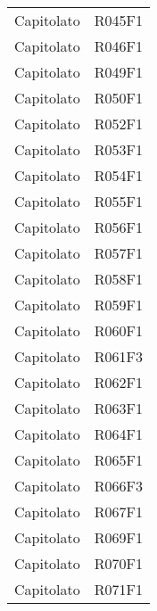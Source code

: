 \documentclass[../analisi-dei-requisiti.tex]{subfiles}
\begin{document}
\begin{center}
\begin{longtable}[H]{ p{3cm} | p{4cm} }
  Capitolato                    & R045F1                               \\
  Capitolato                    & R046F1                               \\
  Capitolato                    & R049F1                               \\
  Capitolato                    & R050F1                               \\
  Capitolato                    & R052F1                               \\
  Capitolato                    & R053F1                               \\
  Capitolato                    & R054F1                               \\
  Capitolato                    & R055F1                               \\
  Capitolato                    & R056F1                               \\
  Capitolato                    & R057F1                               \\
  Capitolato                    & R058F1                               \\
  Capitolato                    & R059F1                               \\
  Capitolato                    & R060F1                               \\
  Capitolato                    & R061F3                               \\
  Capitolato                    & R062F1                               \\
  Capitolato                    & R063F1                               \\
  Capitolato                    & R064F1                               \\
  Capitolato                    & R065F1                               \\
  Capitolato                    & R066F3                               \\
  Capitolato                    & R067F1                               \\
  Capitolato                    & R069F1                               \\
  Capitolato                    & R070F1                               \\
  Capitolato                    & R071F1                               \\

\end{longtable}
\end{center}
\end{document}
